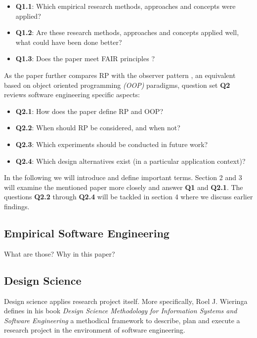 \documentclass[12pt,a4paper]{article}
\begin{document}
\begin{itemize}
	\item \textbf{Q1.1}: Which empirical research methods, approaches and concepts were applied?
	\item \textbf{Q1.2}: Are these research methods, approaches and concepts applied well, what could have been done better?
	\item \textbf{Q1.3}: Does the paper meet FAIR principles \cite{2019arXiv190805986H} \cite{wilkinson:2016}?
\end{itemize}

As the paper further compares RP with the observer pattern \cite{gamma1995design}, an equivalent based on object oriented programming \emph{(OOP)} paradigms, question set \textbf{Q2} reviews software engineering specific aspects:

\begin{itemize}
	\item \textbf{Q2.1}: How does the paper define RP and OOP?
	\item \textbf{Q2.2}: When should RP be considered, and when not?
	\item \textbf{Q2.3}: Which experiments should be conducted in future work?
	\item \textbf{Q2.4}: Which design alternatives exist (in a particular application context)?
\end{itemize}

In the following we will introduce and define important terms. Section 2 and 3 will examine the mentioned paper more closely and answer \textbf{Q1} and \textbf{Q2.1}. The questions \textbf{Q2.2} through \textbf{Q2.4} will be tackled in section 4 where we discuss earlier findings.

\subsection{Empirical Software Engineering}
What are those? Why in this paper?

\subsection{Design Science}
Design science applies research project itself. More specifically, Roel J. Wieringa defines in his book \emph{Design Science Methodology for Information Systems and Software Engineering} \cite{wieringa} a methodical framework \cite{balestra:2019:designscience:articactandcontext} to describe, plan and execute a research project in the environment of software engineering.
\end{document}
